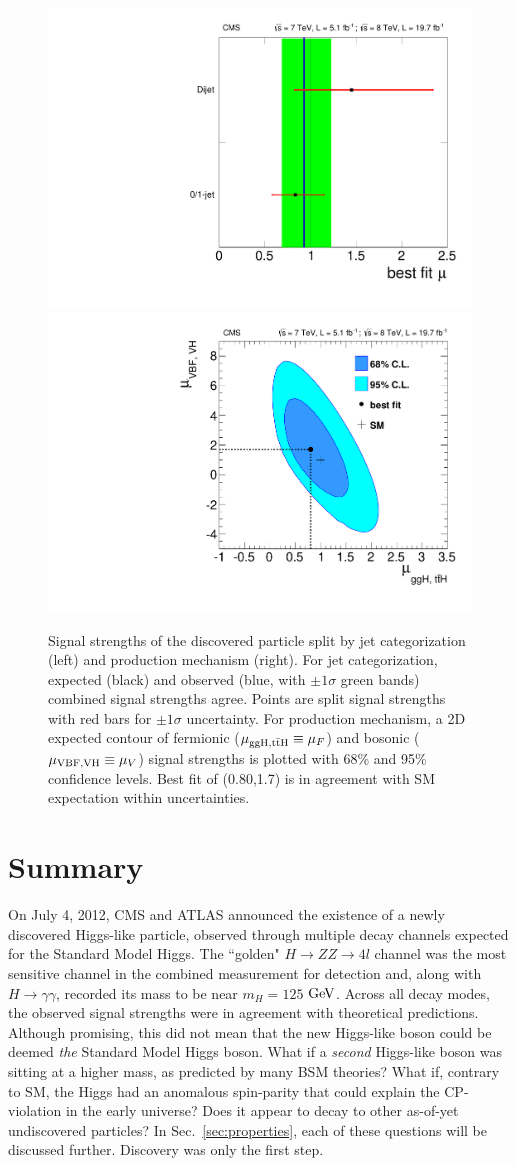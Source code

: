 \begin{figure}[htbp]
\begin{center}
\includegraphics[width=.45\linewidth]{HiggsDiscovery/figures/mu_bestfit_bycategory.pdf}
\includegraphics[width=.45\linewidth]{HiggsDiscovery/figures/RVRF.pdf}
\caption[Signal Strengths of the Discovered Particle Split By Jet Categorization and Production Mechanism]{Signal strengths of the discovered particle split by jet categorization (left) and production mechanism (right). For jet categorization, expected (black) and observed (blue, with $\pm1\sigma$ green bands) combined signal strengths agree. Points are split signal strengths with red bars for $\pm1\sigma$ uncertainty. For production mechanism, a 2D expected contour of fermionic ($\mu_{\rm{ggH,t\bar{t}H}}\equiv\mu_F$) and bosonic ($\mu_{\rm{VBF,VH}}\equiv\mu_V$) signal strengths is plotted with 68\% and 95\% confidence levels. Best fit of (0.80,1.7) is in agreement with SM expectation within uncertainties.}
\label{fig:SignalStrengths}
\end{center}
\end{figure}

\section{Summary}
\label{sec:discovery_summary}

On July 4, 2012, CMS and ATLAS announced the existence of a newly discovered Higgs-like particle, observed through multiple decay channels expected for the Standard Model Higgs. The ``golden" $H \rightarrow ZZ \rightarrow 4l$ channel was the most sensitive channel in the combined measurement for detection and, along with $H\rightarrow \gamma\gamma$, recorded its mass to be near $m_H=125$ $\rm{GeV}$. Across all decay modes, the observed signal strengths were in agreement with theoretical predictions. Although promising, this did not mean that the new Higgs-like boson could be deemed \textit{the} Standard Model Higgs boson. What if a \textit{second} Higgs-like boson was sitting at a higher mass, as predicted by many BSM theories? What if, contrary to SM, the Higgs had an anomalous spin-parity that could explain the CP-violation in the early universe? Does it appear to decay to other as-of-yet undiscovered particles? In Sec.~\ref{sec:properties}, each of these questions will be discussed further. Discovery was only the first step.
